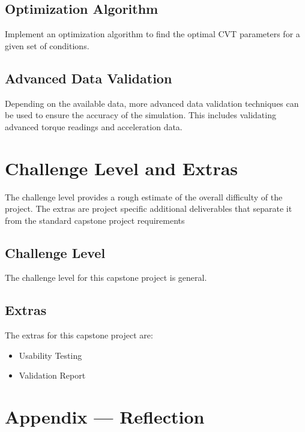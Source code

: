 \documentclass{article}
\begin{document}
\subsection{Optimization Algorithm}
Implement an optimization algorithm to find the optimal CVT parameters for a given set of 
conditions.

\subsection{Advanced Data Validation}
Depending on the available data, more advanced data validation techniques can be used to 
ensure the accuracy of the simulation. This includes validating advanced torque readings and 
acceleration data.

\section{Challenge Level and Extras}
The challenge level provides a rough estimate of the overall difficulty of the project.
The extras are project specific additional deliverables that separate it from the standard capstone project requirements

\subsection{Challenge Level}

The challenge level for this capstone project is general.

\subsection{Extras}
The extras for this capstone project are:
\begin{itemize}
    \item Usability Testing
    \item Validation Report
\end{itemize}


\newpage{}

\section*{Appendix --- Reflection}


\end{document}
